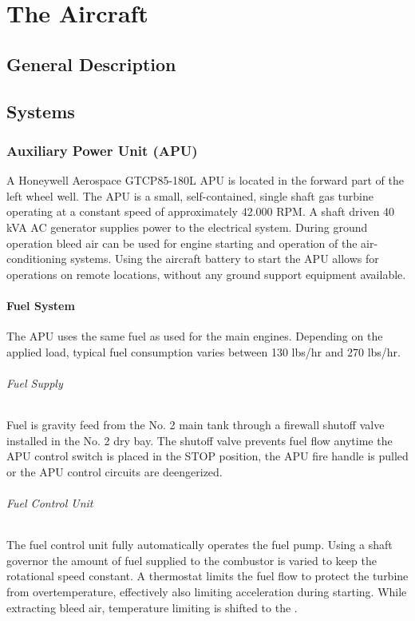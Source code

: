 \part{The Aircraft}
\chapter{General Description}

\chapter{Systems}

\section{Auxiliary Power Unit (APU)}
\label{sec:apu}

A Honeywell Aerospace GTCP85-180L \gls{APU} is located in the forward part of the left wheel well. The \gls{APU} is a small, self-contained, single shaft gas turbine operating at a constant speed of approximately 42.000 \gls{RPM}. A shaft driven 40 \gls{kVA} AC generator supplies power to the electrical system. During ground operation bleed air can be used for engine starting and operation of the air-conditioning systems. Using the aircraft battery to start the \gls{APU} allows for operations on remote locations, without any ground support equipment available.


\subsection{Fuel System}

The APU uses the same fuel as used for the main engines. Depending on the applied load, typical fuel consumption varies between 130 \gls{lbs/hr} and 270 \gls{lbs/hr}.

\paragraph*{Fuel Supply}
Fuel is gravity feed from the No. 2 main tank through a firewall shutoff valve installed in the No. 2 dry bay. The shutoff valve prevents fuel flow anytime the \gls{APU} control switch is placed in the STOP position, the \gls{APU} fire handle is pulled or the \gls{APU} control circuits are deengerized.

\paragraph*{Fuel Control Unit}
The fuel control unit fully automatically operates the fuel pump. Using a shaft governor the amount of fuel supplied to the combustor is varied to keep the rotational speed constant. A thermostat limits the fuel flow to protect the turbine from overtemperature, effectively also limiting acceleration during starting. While extracting bleed air, temperature limiting is shifted to the .

